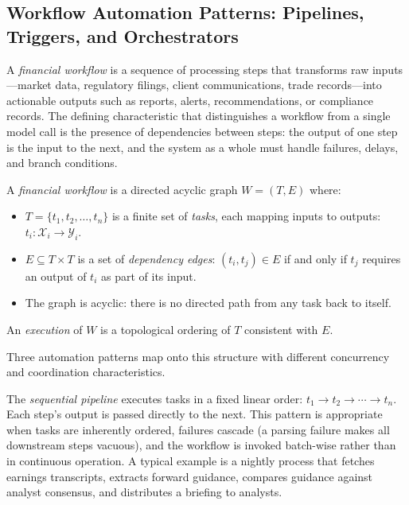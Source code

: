 \begin{context}

\subsection{Workflow Automation Patterns: Pipelines, Triggers, and Orchestrators}
\label{subsec:af-workflows-patterns}

A \emph{financial workflow} is a sequence of processing steps that transforms raw inputs---market data, regulatory filings, client communications, trade records---into actionable outputs such as reports, alerts, recommendations, or compliance records. The defining characteristic that distinguishes a workflow from a single model call is the presence of dependencies between steps: the output of one step is the input to the next, and the system as a whole must handle failures, delays, and branch conditions.

\begin{deepdive}
\begin{definition}
\label{def:workflow-dag}
A \emph{financial workflow} is a directed acyclic graph $W = (T, E)$ where:
\begin{itemize}
  \item $T = \{t_1, t_2, \ldots, t_n\}$ is a finite set of \emph{tasks}, each mapping inputs to outputs: $t_i: \mathcal{X}_i \to \mathcal{Y}_i$.
  \item $E \subseteq T \times T$ is a set of \emph{dependency edges}: $(t_i, t_j) \in E$ if and only if $t_j$ requires an output of $t_i$ as part of its input.
  \item The graph is acyclic: there is no directed path from any task back to itself.
\end{itemize}
An \emph{execution} of $W$ is a topological ordering of $T$ consistent with $E$.
\end{definition}
\end{deepdive}

Three automation patterns map onto this structure with different concurrency and coordination characteristics.

The \emph{sequential pipeline} executes tasks in a fixed linear order: $t_1 \to t_2 \to \cdots \to t_n$. Each step's output is passed directly to the next. This pattern is appropriate when tasks are inherently ordered, failures cascade (a parsing failure makes all downstream steps vacuous), and the workflow is invoked batch-wise rather than in continuous operation. A typical example is a nightly process that fetches earnings transcripts, extracts forward guidance, compares guidance against analyst consensus, and distributes a briefing to analysts.


\end{context}
